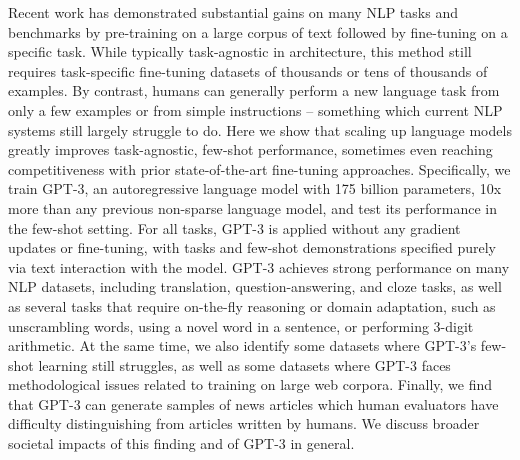 Recent work has demonstrated substantial gains on many NLP tasks and benchmarks by pre-training on a large corpus of text followed by fine-tuning on a specific task. While typically task-agnostic in architecture, this method still requires task-specific fine-tuning datasets of thousands or tens of thousands of examples. By contrast, humans can generally perform a new language task from only a few examples or from simple instructions – something which current NLP systems still largely struggle to do. Here we show that scaling up language models greatly improves task-agnostic, few-shot performance, sometimes even reaching competitiveness with prior state-of-the-art fine-tuning approaches. Specifically, we train GPT-3, an autoregressive language model with 175 billion parameters, 10x more than any previous non-sparse language model, and test its performance in the few-shot setting.  For all tasks, GPT-3 is applied without any gradient updates or fine-tuning, with tasks and few-shot demonstrations specified purely via text interaction with the model.  GPT-3 achieves strong performance on many NLP datasets, including translation, question-answering, and cloze tasks, as well as several tasks that require on-the-fly reasoning or domain adaptation, such as unscrambling words, using a novel word in a sentence, or performing 3-digit arithmetic. At the same time, we also identify some datasets where GPT-3's few-shot learning still struggles, as well as some datasets where GPT-3 faces methodological issues related to training on large web corpora. Finally, we find that GPT-3 can generate samples of news articles which human evaluators have difficulty distinguishing from articles written by humans.  We discuss broader societal impacts of this finding and of GPT-3 in general.